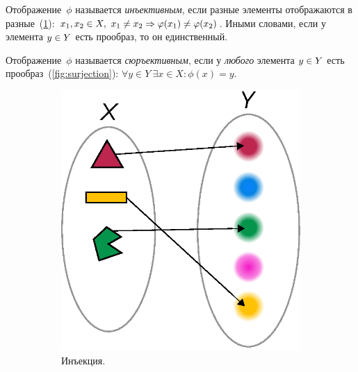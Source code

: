 \documentclass[a4paper,12pt]{article}
\begin{document}
  \begin{definition}
    Отображение~$\phi$ называется \emph{инъективным}, если разные элементы отображаются в разные~(\ref{fig:injection}):
    $
      x_1, x_2 \hm\in X,\ x_1 \hm{\not=} x_2 \hm\Rightarrow \phi(x_1) \hm{\not=} \phi(x_2)
    $.
    Иными словами, если у элемента $y \hm\in Y$ есть прообраз, то он единственный.
  \end{definition}
  
  \begin{definition}
    Отображение~$\phi$ называется \emph{сюръективным}, если у \emph{любого} элемента $y \hm\in Y$ есть прообраз~(\ref{fig:surjection}):
    $
      \forall y \in Y\ \exists x \in X\colon \phi(x) = y
    $.
  \end{definition}
  
  \begin{figure}[ht]
    \centering
    
    \begin{subfigure}[b]{0.3\textwidth}
      \centering
    
      \includegraphics[width=\columnwidth]{injection}
    
      \caption{Инъекция.}
      \label{fig:injection}
    \end{subfigure}
    \hspace{2em}
    \begin{subfigure}[b]{0.3\textwidth}
      

\end{subfigure}
\end{figure}
\end{document}
